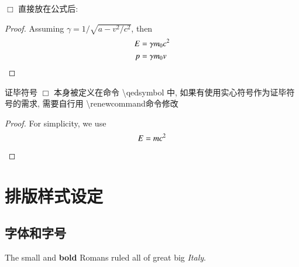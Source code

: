 \documentclass[a4paper]{ctexart}
\begin{document}
    $\Box$ 直接放在公式后:
    \begin{proof}
        Assuming $\gamma = 1/\sqrt{a-v^2/c^2}$, then
        \begin{equation}
            \begin{aligned}
                E & = \gamma m_0 c^2 \\ 
                p & = \gamma m_0 v \qedhere
            \end{aligned}
        \end{equation}
    \end{proof}
    证毕符号 $\Box$ 本身被定义在命令 \textbackslash qedsymbol 中,%
    如果有使用实心符号作为证毕符号的需求, 需要自行用%
    \textbackslash renewcommand命令修改
    \renewcommand{\qedsymbol}{\rule{1ex}{1.5ex}}
    \renewcommand{\proofname}{\textit{Proof}}    
    \begin{proof}
        For simplicity, we use
        \[ E=mc^2 \qedhere \]
    \end{proof}
    \section{排版样式设定}
    \subsection{字体和字号}
    {\small The small and \textbf{bold} Romans ruled}
    {\Large all of great big {\itshape Italy}.}
\end{document}
